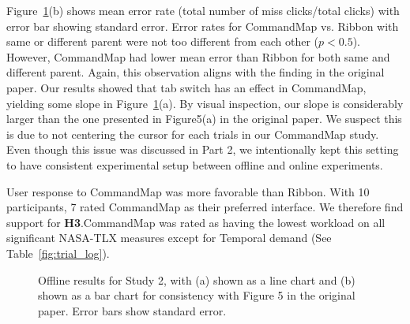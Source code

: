 \documentclass{article}
\begin{document}
Figure~\ref{fig:result1}(b) shows mean error rate (total number of miss clicks/total clicks) with error bar showing standard error. Error rates for CommandMap vs. Ribbon with same or different parent were not too different from each other ($p<0.5$). However, CommandMap had lower mean error than Ribbon for both same and different parent. Again, this observation aligns with the finding in the original paper. Our results showed that tab switch has an effect in CommandMap, yielding some slope in Figure~\ref{fig:result1}(a). By visual inspection, our slope is considerably larger than the one presented in Figure5(a) in the original paper. We suspect this is due to not centering the cursor for each trials in our CommandMap study. Even though this issue was discussed in Part 2, we intentionally kept this setting to have consistent experimental setup between offline and online experiments. 

User response to CommandMap was more favorable than Ribbon. With 10 participants, 7 rated CommandMap as their preferred interface. We therefore find support for \textbf{H3}.CommandMap was rated as having the lowest workload on all significant NASA-TLX measures except for Temporal demand (See Table~\ref{fig:trial_log}). 

\begin{figure}[tbh]
    \centering
    \caption{Offline results for Study 2, with (a) shown as a line chart and (b) shown as a bar chart for consistency with Figure 5 in the original paper. Error bars show standard error.}
    \label{fig:result1}
\end{figure}
\end{document}
